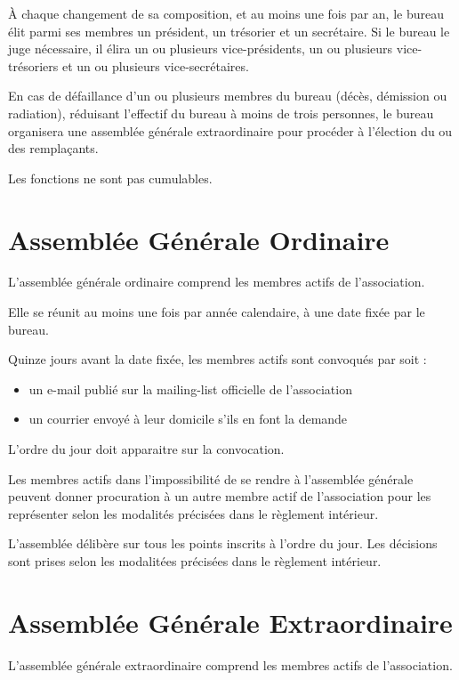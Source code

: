 \documentclass[a4paper, 11pt]{article}
\begin{document}
À chaque changement de sa composition, et au moins une fois par an, le bureau élit parmi ses membres un président, un
trésorier et un secrétaire.
Si le bureau le juge nécessaire, il élira un ou plusieurs vice-présidents, un ou plusieurs vice-trésoriers et un ou
plusieurs vice-secrétaires.


En cas de défaillance d'un ou plusieurs membres du bureau (décès, démission ou radiation), réduisant l'effectif du
bureau à moins de trois personnes, le bureau organisera une assemblée générale extraordinaire pour procéder à l'élection
du ou des remplaçants.

Les fonctions ne sont pas cumulables.


\section{Assemblée Générale Ordinaire} %

L'assemblée générale ordinaire comprend les membres actifs de l'association.

Elle se réunit au moins une fois par année calendaire, à une date fixée par le bureau.

Quinze jours avant la date fixée, les membres actifs sont convoqués par soit :

\begin{itemize}
    \item un e-mail publié sur la mailing-list officielle de l'association
    \item un courrier envoyé à leur domicile s'ils en font la demande
\end{itemize}

L'ordre du jour doit apparaitre sur la convocation.

Les membres actifs dans l'impossibilité de se rendre à l'assemblée générale peuvent donner procuration à un autre membre
actif de l'association pour les représenter selon les modalités précisées dans le règlement intérieur.

L'assemblée délibère sur tous les points inscrits à l'ordre du jour. Les décisions sont prises selon les modalitées
précisées dans le règlement intérieur.


\section{Assemblée Générale Extraordinaire} %

L'assemblée générale extraordinaire comprend les membres actifs de l'association.
\end{document}

